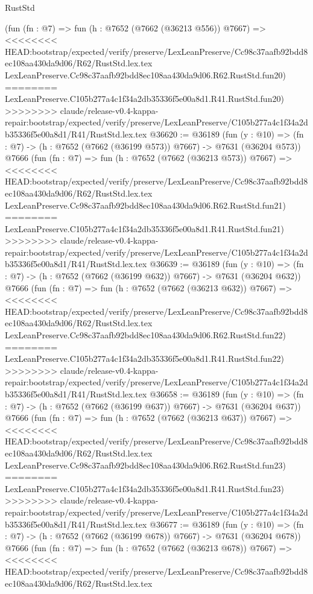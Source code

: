 \begin{lexlean}{RustStd}
\begin{coremodule}
{\begin{coremodule}
{{{{{{{{{{{{{{{{{{{{{{{{{{{{{{{{{{{{{{{{{{{{{{{{{{{{{    (fun (fn : @7) =>
    fun (h : @7652 (@7662 (@36213 @556)) @7667) =>
<<<<<<<< HEAD:bootstrap/expected/verify/preserve/LexLeanPreserve/Cc98c37aafb92bdd8ec108aa430da9d06/R62/RustStd.lex.tex
    LexLeanPreserve.Cc98c37aafb92bdd8ec108aa430da9d06.R62.RustStd.fun20)
========
    LexLeanPreserve.C105b277a4c1f34a2db35336f5e00a8d1.R41.RustStd.fun20)
>>>>>>>> claude/release-v0.4-kappa-repair:bootstrap/expected/verify/preserve/LexLeanPreserve/C105b277a4c1f34a2db35336f5e00a8d1/R41/RustStd.lex.tex
@36620 := @36189
    (fun (y : @10) => (fn : @7) -> (h : @7652 (@7662 (@36199 @573)) @7667) -> @7631 (@36204 @573))
    @7666
    (fun (fn : @7) =>
    fun (h : @7652 (@7662 (@36213 @573)) @7667) =>
<<<<<<<< HEAD:bootstrap/expected/verify/preserve/LexLeanPreserve/Cc98c37aafb92bdd8ec108aa430da9d06/R62/RustStd.lex.tex
    LexLeanPreserve.Cc98c37aafb92bdd8ec108aa430da9d06.R62.RustStd.fun21)
========
    LexLeanPreserve.C105b277a4c1f34a2db35336f5e00a8d1.R41.RustStd.fun21)
>>>>>>>> claude/release-v0.4-kappa-repair:bootstrap/expected/verify/preserve/LexLeanPreserve/C105b277a4c1f34a2db35336f5e00a8d1/R41/RustStd.lex.tex
@36639 := @36189
    (fun (y : @10) => (fn : @7) -> (h : @7652 (@7662 (@36199 @632)) @7667) -> @7631 (@36204 @632))
    @7666
    (fun (fn : @7) =>
    fun (h : @7652 (@7662 (@36213 @632)) @7667) =>
<<<<<<<< HEAD:bootstrap/expected/verify/preserve/LexLeanPreserve/Cc98c37aafb92bdd8ec108aa430da9d06/R62/RustStd.lex.tex
    LexLeanPreserve.Cc98c37aafb92bdd8ec108aa430da9d06.R62.RustStd.fun22)
========
    LexLeanPreserve.C105b277a4c1f34a2db35336f5e00a8d1.R41.RustStd.fun22)
>>>>>>>> claude/release-v0.4-kappa-repair:bootstrap/expected/verify/preserve/LexLeanPreserve/C105b277a4c1f34a2db35336f5e00a8d1/R41/RustStd.lex.tex
@36658 := @36189
    (fun (y : @10) => (fn : @7) -> (h : @7652 (@7662 (@36199 @637)) @7667) -> @7631 (@36204 @637))
    @7666
    (fun (fn : @7) =>
    fun (h : @7652 (@7662 (@36213 @637)) @7667) =>
<<<<<<<< HEAD:bootstrap/expected/verify/preserve/LexLeanPreserve/Cc98c37aafb92bdd8ec108aa430da9d06/R62/RustStd.lex.tex
    LexLeanPreserve.Cc98c37aafb92bdd8ec108aa430da9d06.R62.RustStd.fun23)
========
    LexLeanPreserve.C105b277a4c1f34a2db35336f5e00a8d1.R41.RustStd.fun23)
>>>>>>>> claude/release-v0.4-kappa-repair:bootstrap/expected/verify/preserve/LexLeanPreserve/C105b277a4c1f34a2db35336f5e00a8d1/R41/RustStd.lex.tex
@36677 := @36189
    (fun (y : @10) => (fn : @7) -> (h : @7652 (@7662 (@36199 @678)) @7667) -> @7631 (@36204 @678))
    @7666
    (fun (fn : @7) =>
    fun (h : @7652 (@7662 (@36213 @678)) @7667) =>
<<<<<<<< HEAD:bootstrap/expected/verify/preserve/LexLeanPreserve/Cc98c37aafb92bdd8ec108aa430da9d06/R62/RustStd.lex.tex
}}}}}}}}}}}}}}}}}}}}}}}}}}}}}}}}}}}}}}}}}}}}}}}}}}}}}
\end{coremodule}}
\end{coremodule}
\end{lexlean}
